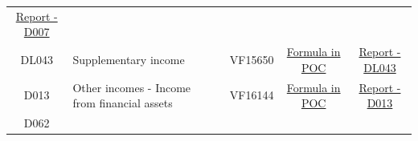 \documentclass[]{book}
\begin{document}
\begin{longtable}[]{@{}cllccc@{}}
\begin{minipage}[t]{0.16\columnwidth}
\href{./Auxiliary\%20Files/technical_reports/variable_report/D007.pdf}{Report - D007}\strut
\end{minipage}\tabularnewline
\begin{minipage}[t]{0.08\columnwidth}\centering
DL043\strut
\end{minipage} & \begin{minipage}[t]{0.20\columnwidth}\raggedright
Supplementary income\strut
\end{minipage} & \begin{minipage}[t]{0.16\columnwidth}\raggedright
\strut
\end{minipage} & \begin{minipage}[t]{0.09\columnwidth}\centering
VF15650\strut
\end{minipage} & \begin{minipage}[t]{0.15\columnwidth}\centering
\protect\hyperlink{dl043---formula-in-poc}{Formula in POC}\strut
\end{minipage} & \begin{minipage}[t]{0.16\columnwidth}\centering
\href{./Auxiliary\%20Files/technical_reports/variable_report/DL043.pdf}{Report - DL043}\strut
\end{minipage}\tabularnewline
\begin{minipage}[t]{0.08\columnwidth}\centering
D013\strut
\end{minipage} & \begin{minipage}[t]{0.20\columnwidth}\raggedright
Other incomes - Income from financial assets\strut
\end{minipage} & \begin{minipage}[t]{0.16\columnwidth}\raggedright
\strut
\end{minipage} & \begin{minipage}[t]{0.09\columnwidth}\centering
VF16144\strut
\end{minipage} & \begin{minipage}[t]{0.15\columnwidth}\centering
\protect\hyperlink{d013---formula-in-poc}{Formula in POC}\strut
\end{minipage} & \begin{minipage}[t]{0.16\columnwidth}\centering
\href{./Auxiliary\%20Files/technical_reports/variable_report/D013(!).pdf}{Report - D013}\strut
\end{minipage}\tabularnewline
\begin{minipage}[t]{0.08\columnwidth}\centering
D062\strut
\end{minipage} & \begin{minipage}[t]{0.20\columnwidth}\raggedright

\end{minipage}
\end{longtable}
\end{document}
